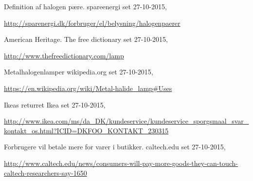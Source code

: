  Definition af halogen pære.
  spareenergi
  set 27-10-2015,
  
  \url{http://sparenergi.dk/forbruger/el/belysning/halogenpaerer}

  American Heritage.
  The free dictionary
  set 27-10-2015,
  
  \url{http://www.thefreedictionary.com/lamp}

  Metalhalogenlamper
  wikipedia.org
  set 27-10-2015,
  
  \url{https://en.wikipedia.org/wiki/Metal-halide_lamp#Uses}

  Ikeas returret
  Ikea
  set 27-10-2015,
  
  \url{http://www.ikea.com/ms/da_DK/kundeservice/kundeservice_sporgsmaal_svar_kontakt_os.html?ICID=DKFOO_KONTAKT_230315}


  Forbrugere vil betale mere for varer i butikker.
  caltech.edu
  set 27-10-2015,
  
  \url{http://www.caltech.edu/news/consumers-will-pay-more-goods-they-can-touch-caltech-researchers-say-1650}

